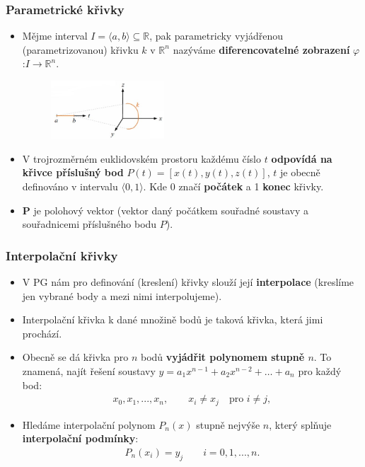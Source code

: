 \subsubsection{Parametrické křivky}
\begin{itemize}
	\item Mějme interval $I = \langle a, b \rangle \subseteq \mathbb{R}$, pak parametricky vyjádřenou (parametrizovanou) křivku $k$ v $\mathbb{R}^n$ nazýváme \textbf{diferencovatelné zobrazení} $\varphi$  :$I \rightarrow \mathbb{R}^n$.
\begin{figure}[H]
\centering
\includegraphics[width=0.4\textwidth]{assets/3_param_curve}
\end{figure}
	\item V trojrozměrném euklidovském prostoru každému číslo $t$ \textbf{odpovídá na křivce příslušný bod} $P(t) = [x(t), y(t), z(t)]$, $t$ je obecně definováno v intervalu $\langle 0, 1 \rangle$. Kde 0 značí \textbf{počátek} a 1 \textbf{konec} křivky.
	\item \textbf{P} je polohový vektor (vektor daný počátkem souřadné soustavy a souřadnicemi příslušného bodu $P$).
\end{itemize}

\subsubsection{Interpolační křivky}
\begin{itemize}
	\item V PG nám pro definování (kreslení) křivky slouží její \textbf{interpolace} (kreslíme jen vybrané body a mezi nimi interpolujeme).
	\item Interpolační křivka k dané množině bodů je taková křivka, která jimi prochází.
	\item Obecně se dá křivka pro $ n $ bodů \textbf{vyjádřit polynomem stupně $ n $}. To znamená, najít řešení soustavy $y = a_1x^{n - 1} + a_2x^{n - 2} + \ldots + a_n$ pro každý bod:
	\begin{equation*}  
			\begin{array}{c}
			  x_{0},x_{1},...,x_{n},  \quad \quad x_{i} \neq x_{j} \quad \textrm{pro }  i \neq j,
			  \end{array}
			\end{equation*}
	\item Hledáme interpolační polynom $P_{n}(x)$ stupně nejvýše $n$, který splňuje \textbf{interpolační podmínky}:
			\begin{equation*}  
			\begin{array}{c}
			  P_{n}(x_{i}) = y_{j} \quad \quad i = 0,1,...,n.
			  \end{array}
			\end{equation*}
	\end{itemize}

